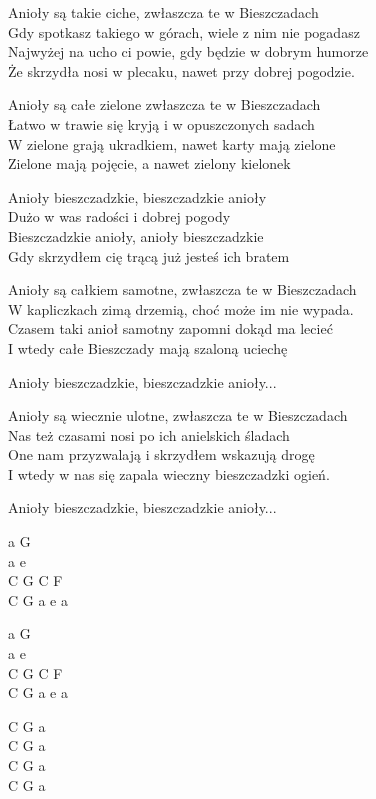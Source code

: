 \begin{text}
    Anioły są takie ciche, zwłaszcza te w Bieszczadach\\
    Gdy spotkasz takiego w górach, wiele z nim nie pogadasz\\
    Najwyżej na ucho ci powie, gdy będzie w dobrym humorze\\
    Że skrzydła nosi w plecaku, nawet przy dobrej pogodzie.

    Anioły są całe zielone zwłaszcza te w Bieszczadach\\
    Łatwo w trawie się kryją i w opuszczonych sadach\\
    W zielone grają ukradkiem, nawet karty mają zielone\\
    Zielone mają pojęcie, a nawet zielony kielonek

    \vin Anioły bieszczadzkie, bieszczadzkie anioły\\
    \vin Dużo w was radości i dobrej pogody\\
    \vin Bieszczadzkie anioły, anioły bieszczadzkie\\
    \vin Gdy skrzydłem cię trącą już jesteś ich bratem

    Anioły są całkiem samotne, zwłaszcza te w Bieszczadach\\
    W kapliczkach zimą drzemią, choć może im nie wypada.\\
    Czasem taki anioł samotny zapomni dokąd ma lecieć\\
    I wtedy całe Bieszczady mają szaloną uciechę

    \vin Anioły bieszczadzkie, bieszczadzkie anioły...

    Anioły są wiecznie ulotne, zwłaszcza te w Bieszczadach\\
    Nas też czasami nosi po ich anielskich śladach\\
    One nam przyzwalają i skrzydłem wskazują drogę\\
    I wtedy w nas się zapala wieczny bieszczadzki ogień.

    \vin Anioły bieszczadzkie, bieszczadzkie anioły...

\end{text}
\begin{chord}
    a G\\
    a e\\
    C G C F\\
    C G a e a

    a G\\
    a e\\
    C G C F\\
    C G a e a

    C G a\\
    C G a\\ 
    C G a\\
    C G a
\end{chord}